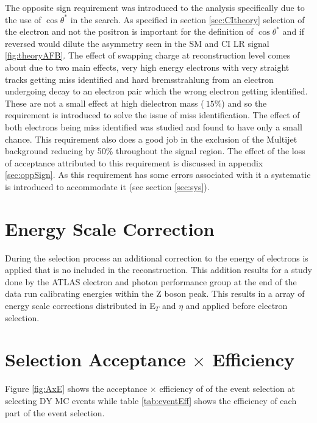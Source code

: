    The opposite sign requirement was introduced to the analysis specifically due to the use of $\cos{\theta^{*}}$ in the search. As specified in section \ref{sec:CItheory} selection of the electron and not the positron is important for the definition of $\cos{\theta^{*}}$ and if reversed would dilute the asymmetry seen in the SM and CI LR signal \ref{fig:theoryAFB}. The effect of swapping charge at reconstruction level comes about due to two main effects, very high energy electrons with very straight tracks getting miss identified and hard bremsstrahlung from an electron undergoing decay to an electron pair which the wrong electron getting identified. These are not a small effect at high dielectron mass ($~ 15\%$) and so the requirement is introduced to solve the issue of miss identification. The effect of both electrons being miss identified was studied and found to have only a small chance. This requirement also does a good job in the exclusion of the Multijet background reducing by 50\% throughout the signal region. The effect of the loss of acceptance attributed to this requirement is discussed in appendix \ref{sec:oppSign}. As this requirement has some errors associated with it a systematic is introduced to accommodate it (see section \ref{sec:sys}). 


\section{Energy Scale Correction}

   During the selection process an additional correction to the energy of electrons is applied that is no included in the reconstruction. This addition results for a study done by the ATLAS electron and photon performance group at the end of the data run calibrating energies within the Z boson peak. This results in a array of energy scale corrections distributed in E$_{T}$ and $\eta$ and applied before electron selection.




\section{Selection Acceptance $\times$ Efficiency}

   Figure \ref{fig:AxE} shows the acceptance $\times$ efficiency of of the event selection at selecting DY MC events while table \ref{tab:eventEff} shows the efficiency of each part of the event selection. 



